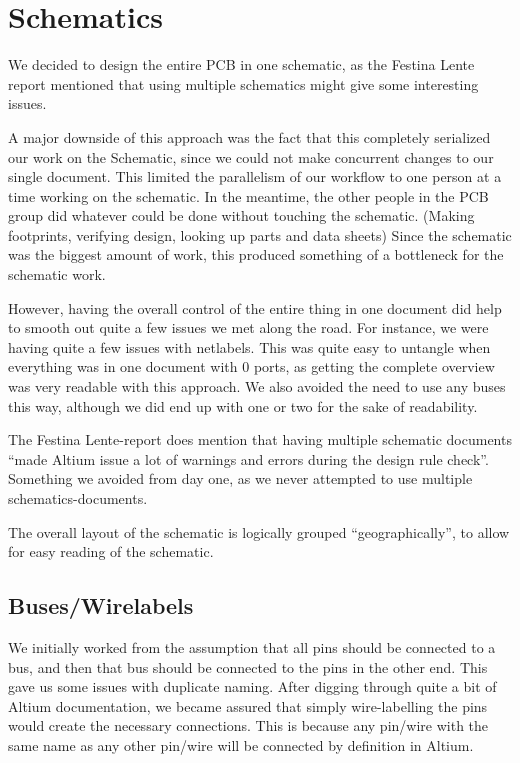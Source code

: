 \section {Schematics}

We decided to design the entire \ac{PCB} in one schematic, as the Festina Lente
report mentioned that using multiple schematics might give
some interesting issues.

A major downside of this approach was the fact that this completely serialized
our work on the Schematic, since we could not make concurrent changes to our
single document. This limited the parallelism of our workflow to one person at a
time working on the schematic.  In the meantime, the other people in the
\ac{PCB} group did whatever could be done without touching the
schematic. (Making footprints, verifying design, looking up parts and data
sheets) Since the schematic was the biggest amount of work, this produced
something of a bottleneck for the schematic work.

However, having the overall control of the entire thing in one document
did help to smooth out quite a few issues we met along the road. For instance,
we were having quite a few issues with netlabels. This was quite easy to
untangle when everything was in one document with 0 ports, as getting the
complete overview was very readable with this approach. We also avoided the need
to use any buses this way, although we did end up with one or two for the sake
of readability.

  The
Festina Lente-report does mention that having multiple schematic documents
``made Altium issue a lot of warnings and errors during the design rule
check''\cite[p.~49]{berg2011festinalente}. Something we avoided from day one, as
we never attempted to use multiple schematics-documents. 

The overall layout of the schematic is logically grouped ``geographically'', to
allow for easy reading of the schematic.

\subsection {Buses/Wirelabels}
We initially worked from the assumption that all pins should be connected to a
bus, and then that bus should be connected to the pins in the other end. This
gave us some issues with duplicate naming. After digging through quite a bit of
Altium documentation, we became assured that simply wire-labelling the pins
would create the necessary connections. This is because any pin/wire with the
same name as any other pin/wire will be connected by definition in Altium.

